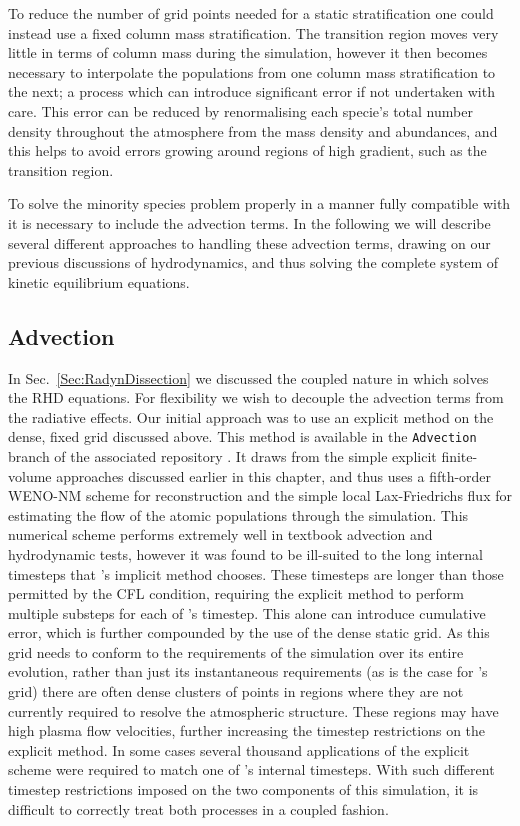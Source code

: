 To reduce the number of grid points needed for a static stratification one could instead use a fixed column mass stratification.
The transition region moves very little in terms of column mass during the simulation, however it then becomes necessary to interpolate the populations from one column mass stratification to the next; a process which can introduce significant error if not undertaken with care.
This error can be reduced by renormalising each specie's total number density throughout the atmosphere from the mass density and abundances, and this helps to avoid errors growing around regions of high gradient, such as the transition region.

To solve the minority species problem properly in a manner fully compatible with \Radyn{} it is necessary to include the advection terms.
In the following we will describe several different approaches to handling these advection terms, drawing on our previous discussions of hydrodynamics, and thus solving the complete system of kinetic equilibrium equations.

\subsection{Advection}

In Sec.~\ref{Sec:RadynDissection} we discussed the coupled nature in which \Radyn{} solves the RHD equations.
For flexibility we wish to decouple the advection terms from the radiative effects.
Our initial approach was to use an explicit method on the dense, fixed grid discussed above.
This method is available in the \texttt{Advection} branch of the associated repository \NeedRef{}.
It draws from the simple explicit finite-volume approaches discussed earlier in this chapter, and thus uses a fifth-order WENO-NM scheme for reconstruction and the simple local Lax-Friedrichs flux for estimating the flow of the atomic populations through the simulation.
This numerical scheme performs extremely well in textbook advection and hydrodynamic tests, however it was found to be ill-suited to the long internal timesteps that \Radyn{}'s implicit method chooses.
These timesteps are longer than those permitted by the CFL condition, requiring the explicit method to perform multiple substeps for each of \Radyn{}'s timestep.
This alone can introduce cumulative error, which is further compounded by the use of the dense static grid.
As this grid needs to conform to the requirements of the simulation over its entire evolution, rather than just its instantaneous requirements (as is the case for \Radyn{}'s grid) there are often dense clusters of points in regions where they are not currently required to resolve the atmospheric structure.
These regions may have high plasma flow velocities, further increasing the timestep restrictions on the explicit method.
In some cases several thousand applications of the explicit scheme were required to match one of \Radyn{}'s internal timesteps.
With such different timestep restrictions imposed on the two components of this simulation, it is difficult to correctly treat both processes in a coupled fashion.

